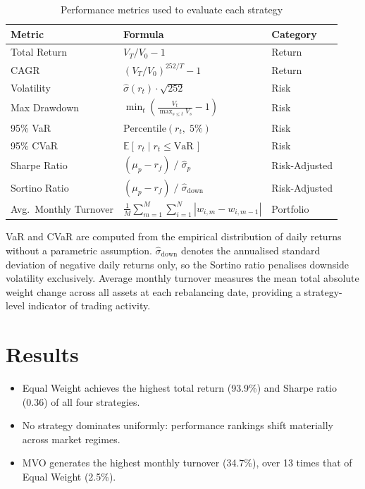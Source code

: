 \documentclass[a4paper,alpha-refs]{scr-contemporary}
\numberwithin{equation}{section}
\begin{document}
\begin{table}[h]
\centering
\caption{Performance metrics used to evaluate each strategy}
\begin{tabular}{l l l}
\toprule
\textbf{Metric} & \textbf{Formula} & \textbf{Category} \\
\midrule
Total Return
    & $V_T / V_0 - 1$
    & Return \\
CAGR
    & $(V_T / V_0)^{252/T} - 1$
    & Return \\
Volatility
    & $\hat{\sigma}(r_t) \cdot \sqrt{252}$
    & Risk \\
Max Drawdown
    & $\displaystyle\min_t \left(\frac{V_t}{\max_{s \leq t} V_s} - 1\right)$
    & Risk \\
95\% VaR
    & $\text{Percentile}(r_t,\; 5\%)$
    & Risk \\
95\% CVaR
    & $\mathbb{E}[\,r_t \mid r_t \leq \text{VaR}\,]$
    & Risk \\
Sharpe Ratio
    & $(\mu_p - r_f) \;/\; \hat{\sigma}_p$
    & Risk-Adjusted \\
Sortino Ratio
    & $(\mu_p - r_f) \;/\; \hat{\sigma}_{\mathrm{down}}$
    & Risk-Adjusted \\
Avg.\ Monthly Turnover
    & $\displaystyle\frac{1}{M}\sum_{m=1}^{M}\sum_{i=1}^{N}|w_{i,m} - w_{i,m-1}|$
    & Portfolio \\
\bottomrule
\end{tabular}
\label{tab:metrics}
\end{table}

\indent VaR and CVaR are computed from the empirical distribution of daily
returns without a parametric assumption. $\hat{\sigma}_{\mathrm{down}}$
denotes the annualised standard deviation of negative daily returns only,
so the Sortino ratio penalises downside volatility exclusively. \newline
\indent Average monthly turnover measures the mean total absolute weight change
across all assets at each rebalancing date, providing a strategy-level
indicator of trading activity.

\section{Results}

\begin{keypoints*}
\begin{itemize}
  \item Equal Weight achieves the highest total return (93.9\%) and Sharpe ratio (0.36) of all four strategies.
  \item No strategy dominates uniformly: performance rankings shift materially across market regimes.
  \item MVO generates the highest monthly turnover (34.7\%), over 13 times that of Equal Weight (2.5\%).
\end{itemize}
\end{keypoints*}
\end{document}
